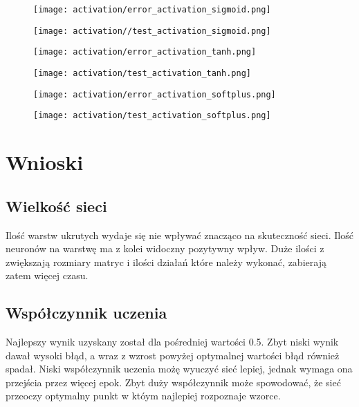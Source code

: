 \documentclass{article}
\begin{document}
\newpage
\begin{figure}[!htb]
  \centering
  \texttt{[image: activation/error\_activation\_sigmoid.png]}
\end{figure}

\begin{figure}[!htb]
  \centering
  \texttt{[image: activation//test\_activation\_sigmoid.png]}
\end{figure}

\begin{figure}[]
  \centering
  \texttt{[image: activation/error\_activation\_tanh.png]}
\end{figure}

\begin{figure}[]
  \centering
  \texttt{[image: activation/test\_activation\_tanh.png]}
\end{figure}

\begin{figure}[]
  \centering
  \texttt{[image: activation/error\_activation\_softplus.png]}
\end{figure}

\begin{figure}[]
  \centering
  \texttt{[image: activation/test\_activation\_softplus.png]}
\end{figure}

\section{Wnioski}

\subsection{Wielkość sieci}

Ilość warstw ukrutych wydaje się nie wpływać znacząco na skuteczność sieci. Ilość neuronów na warstwę ma z kolei widoczny pozytywny wpływ.
Duże ilości z zwiększają rozmiary matryc i ilości działań które należy wykonać, zabierają zatem więcej czasu.

\subsection{Współczynnik uczenia}

Najlepszy wynik uzyskany został dla pośredniej wartości 0.5. Zbyt niski wynik dawał wysoki błąd, a wraz z wzrost powyżej
optymalnej wartości błąd również spadał. Niski współczynnik uczenia możę wyuczyć sieć lepiej, jednak wymaga ona przejścia przez więcej epok.
Zbyt duży współczynnik może spowodować, że sieć przeoczy optymalny punkt w któym najlepiej rozpoznaje wzorce.
\end{document}
